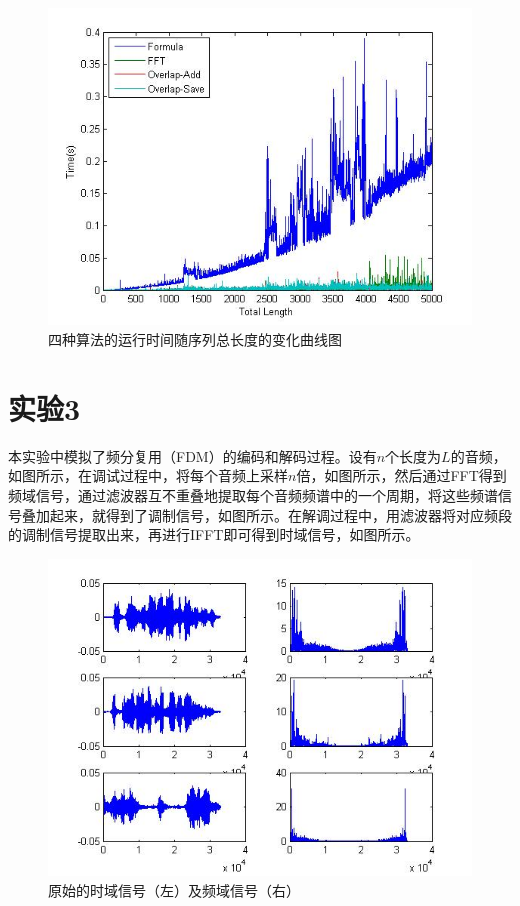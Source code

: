 \documentclass[12pt,a4paper]{article}
\begin{document}
\begin{figure}[htbp]
    \centering
    \includegraphics[width=\textwidth]{fig/conv.jpg}
    \caption{四种算法的运行时间随序列总长度的变化曲线图}
    \label{fig:conv}
\end{figure}

\section{实验3}

本实验中模拟了频分复用（FDM）的编码和解码过程。设有$n$个长度为$L$的音频，如图所示，在调试过程中，将每个音频上采样$n$倍，如图所示，然后通过FFT得到频域信号，通过滤波器互不重叠地提取每个音频频谱中的一个周期，将这些频谱信号叠加起来，就得到了调制信号，如图所示。在解调过程中，用滤波器将对应频段的调制信号提取出来，再进行IFFT即可得到时域信号，如图所示。

\begin{figure}
    \centering
    \includegraphics[width=\textwidth]{fig/original.jpg}
    \caption{原始的时域信号（左）及频域信号（右）}
    \label{fig:original}
\end{figure}
\end{document}
